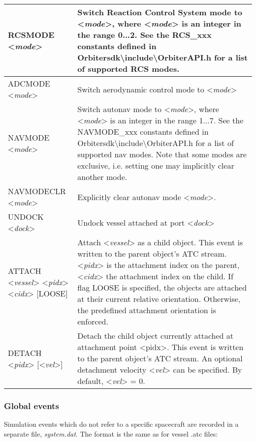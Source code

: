 \documentclass[Orbiter Technical Reference.tex]{subfiles}
\begin{document}
	\begin{longtable}{ |p{}|p{}| }
	\hline\rule{0pt}{2ex}
	RCSMODE <\textit{mode}> & Switch Reaction Control System mode to <\textit{mode}>, where <\textit{mode}> is an integer in the range 0...2. See the RCS\_xxx constants defined in Orbitersdk\textbackslash include\textbackslash OrbiterAPI.h for a list of supported RCS modes.\\
	\hline\rule{0pt}{2ex}
	ADCMODE <\textit{mode}> & Switch aerodynamic control mode to <\textit{mode}>\\
	\hline\rule{0pt}{2ex}
	NAVMODE <\textit{mode}> & Switch autonav mode to <\textit{mode}>, where <\textit{mode}> is an integer in the range 1...7. See the NAVMODE\_xxx constants defined in Orbitersdk\textbackslash include\textbackslash OrbiterAPI.h for a list of supported nav modes. Note that some modes are exclusive, i.e. setting one may implicitly clear another mode.\\
	\hline\rule{0pt}{2ex}
	NAVMODECLR <\textit{mode}> & Explicitly clear autonav mode <\textit{mode}>.\\
	\hline\rule{0pt}{2ex}
	UNDOCK <\textit{dock}> & Undock vessel attached at port <\textit{dock}>\\
	\hline\rule{0pt}{2ex}
	ATTACH <\textit{vessel}> <\textit{pidx}> <\textit{cidx}> [LOOSE] & Attach <\textit{vessel}> as a child object. This event is written to the parent object's ATC stream. <\textit{pidx}> is the attachment index on the parent, <\textit{cidx}> the attachment index on the child. If flag LOOSE is specified, the objects are attached at their current relative orientation. Otherwise, the predefined attachment orientation is enforced.\\
	\hline\rule{0pt}{2ex}
	DETACH <\textit{pidx}> [<\textit{vel}>] & Detach the child object currently attached at attachment point <pidx>. This event is written to the parent object's ATC stream. An optional detachment velocity <\textit{vel}> can be specified. By default, <\textit{vel}> = 0.\\
	\hline
	\end{longtable}


\subsubsection{Global events}
Simulation events which do not refer to a specific spacecraft are recorded in a separate file, \textit{system.dat}. The format is the same as for vessel .atc files:
\end{document}

